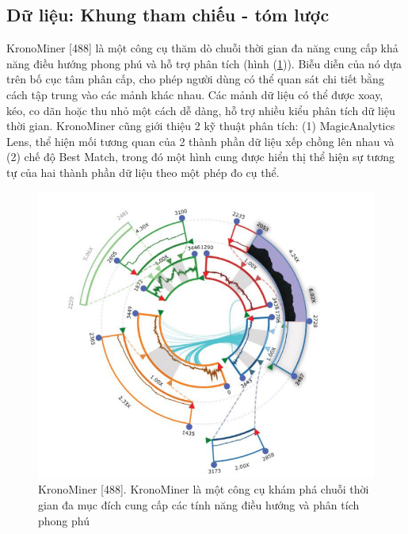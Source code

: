 \subsection{Dữ liệu: Khung tham chiếu - tóm lược}
KronoMiner [488] là một công cụ thăm dò chuỗi thời gian đa năng cung cấp khả năng điều hướng phong phú và hỗ trợ phân tích (hình (\ref{fig:f7.3})). Biễu diễn của nó dựa trên bố cục tâm phân cấp, cho phép người dùng có thể  quan sát chi tiết bằng cách tập trung vào các mảnh khác nhau. Các mảnh dữ liệu có thể được xoay, kéo, co dãn hoặc thu nhỏ một cách dễ dàng, hỗ trợ nhiều kiểu phân tích dữ liệu thời gian. KronoMiner cũng giới thiệu 2 kỹ thuật phân tích: (1) MagicAnalytics Lens, thể hiện mối tương quan của 2 thành phần dữ liệu xếp chồng lên nhau và (2) chế độ Best Match, trong đó một hình cung được hiển thị thể hiện sự tương tự của hai thành phần dữ liệu theo một phép đo cụ thể. 
\begin{figure}[H] %
    \centering %
    \includegraphics[width=1\textwidth]{assets/fig_7_3.png} 
    \caption{KronoMiner [488]. KronoMiner là một công cụ khám phá chuỗi thời gian đa mục đích cung cấp các tính năng điều hướng và phân tích phong phú} %
    \label{fig:f7.3}
\end{figure}